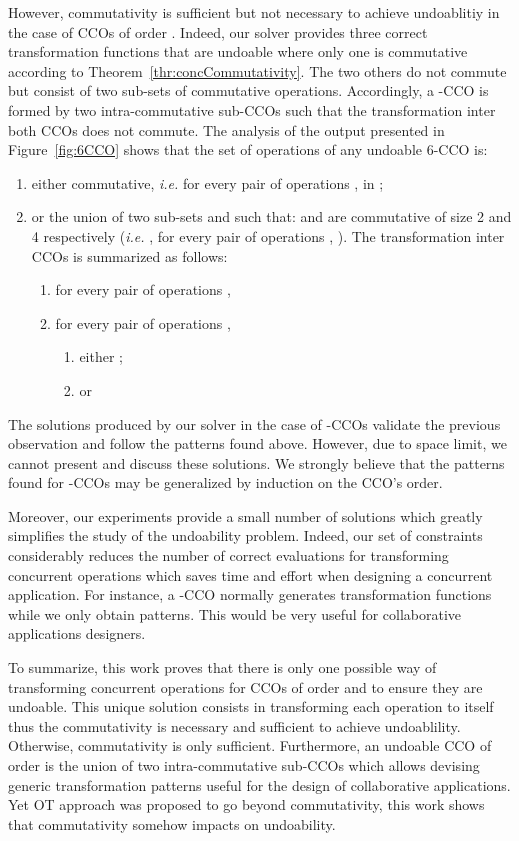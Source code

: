 \documentclass[submission,copyright,creativecommons]{eptcs}
\begin{document}
However,  commutativity is sufficient but not necessary to achieve undoablitiy in the case of CCOs of order .
Indeed, our solver provides three correct transformation functions that are undoable where only  one is commutative according to Theorem~\ref{thr:concCommutativity}. The two others do not commute but consist of two sub-sets of commutative operations. Accordingly,  a -CCO is formed by two  intra-commutative sub-CCOs  such that   the transformation inter both CCOs does not commute. 
The analysis of the output presented in Figure~\ref{fig:6CCO} shows that the set of operations  of any undoable 6-CCO is:
\begin{enumerate}
\item either commutative, \textit{i.e.}  for every  pair of operations ,  in ; 
\item   or the union of two sub-sets  and  such that:
 and  are commutative of size 2 and 4 respectively (\textit{i.e.}  
, for every pair of operations , ). The transformation inter CCOs is summarized as follows: \begin{enumerate}
\item for every pair of operations , 
\item for every pair of operations ,
\begin{enumerate}
\item  either ;
\item or 
\end{enumerate}
\end{enumerate}
\end{enumerate}

The solutions produced by our solver in the case of -CCOs validate the previous observation and follow the patterns found above. However, due to space limit, we cannot present and discuss these solutions.  We strongly believe that the patterns found for -CCOs  may be generalized  by induction  on the CCO's order. 




Moreover, our experiments provide a small number of solutions which greatly simplifies the study of the undoability problem. Indeed, our set of constraints  considerably reduces the number of correct evaluations for transforming concurrent operations which  saves time and effort when designing a concurrent application. For instance, a -CCO normally generates  transformation functions while we  only obtain  patterns. 
This would be very useful for collaborative applications designers.

To summarize, this work proves that there is only one possible way of transforming concurrent operations for CCOs of order  and  to ensure they are undoable. This unique solution consists in transforming each operation to itself thus the commutativity is necessary and sufficient to achieve undoablility. Otherwise,   commutativity is only sufficient. Furthermore, an undoable CCO of order  is the union of two intra-commutative sub-CCOs which allows devising generic transformation patterns useful for the design of collaborative applications.  Yet OT approach was proposed to go beyond commutativity, this work shows that commutativity somehow impacts on undoability.
\end{document}

